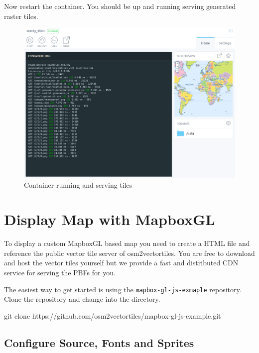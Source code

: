 Now restart the container. You should be up and running serving
generated raster tiles.

\begin{figure}[H]
\centering
\includegraphics[width=1\textwidth]{images/tileserver_kitematic_running.png}
\caption{Container running and serving tiles}
\end{figure}

\section{Display Map with MapboxGL}\label{display-map-with-mapboxgl}

To display a custom MapboxGL based map you need to create a HTML file
and reference the public vector tile server of osm2vectortiles. You are
free to download and host the vector tiles yourself but we provide a
fast and distributed CDN service for serving the PBFs for you.

The easiest way to get started is using the
\texttt{mapbox-gl-js-exmaple} repository. Clone the repository and
change into the directory.

\begin{bashcode}
git clone https://github.com/osm2vectortiles/mapbox-gl-js-example.git
\end{bashcode}

\subsection{Configure Source, Fonts and
Sprites}\label{configure-source-fonts-and-sprites}

